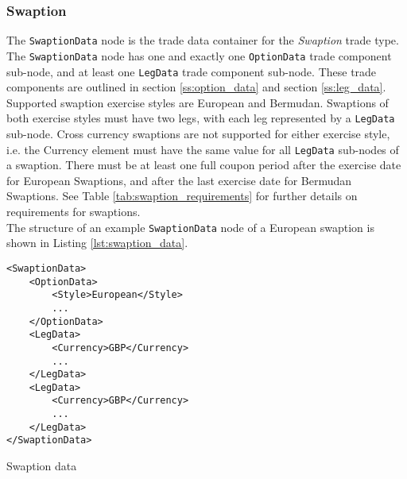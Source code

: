 \subsubsection{Swaption}

The \lstinline!SwaptionData!  node is the trade data container for the \emph{Swaption} trade type. The \lstinline!SwaptionData!
node has one and exactly one \lstinline!OptionData! trade component sub-node, and at least one \lstinline!LegData! trade
component sub-node.  These trade components are outlined in section \ref{ss:option_data} and section
\ref{ss:leg_data}.\\
\vspace{5mm}
Supported swaption exercise styles are European and Bermudan.  Swaptions of both exercise styles must have two legs, with
each leg represented by a \lstinline!LegData! sub-node.  Cross currency swaptions are not supported for either exercise style, i.e. the Currency element must
have the same value for all \lstinline!LegData! sub-nodes of a swaption. There must be at least one full coupon period after the exercise date for European 
Swaptions, and after the last exercise date for Bermudan Swaptions. See Table \ref{tab:swaption_requirements} for further details on requirements for
 swaptions.\\
\vspace{5mm}
The structure of an example \lstinline!SwaptionData!  node of a European swaption is shown in Listing
\ref{lst:swaption_data}.

\begin{listing}[H]
\begin{verbatim}
<SwaptionData>
    <OptionData>
        <Style>European</Style>
        ...
    </OptionData>
    <LegData>
        <Currency>GBP</Currency>
        ...
    </LegData>
    <LegData>
        <Currency>GBP</Currency>
        ...
    </LegData>
</SwaptionData>
\end{verbatim}
\caption{Swaption data}
\label{lst:swaption_data}
\end{listing}

